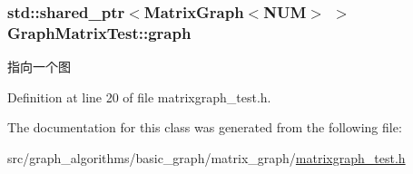 \subsubsection[{graph}]{\setlength{\rightskip}{0pt plus 5cm}std\+::shared\+\_\+ptr$<${\bf Matrix\+Graph}$<${\bf N\+U\+M}$>$ $>$ Graph\+Matrix\+Test\+::graph\hspace{0.3cm}{\ttfamily [protected]}}\label{class_graph_matrix_test_ad384a40b300fe51ecc31c15f197f1723}
指向一个图 

Definition at line 20 of file matrixgraph\+\_\+test.\+h.



The documentation for this class was generated from the following file\+:\begin{DoxyCompactItemize}
\item 
src/graph\+\_\+algorithms/basic\+\_\+graph/matrix\+\_\+graph/\hyperlink{matrixgraph__test_8h}{matrixgraph\+\_\+test.\+h}\end{DoxyCompactItemize}
